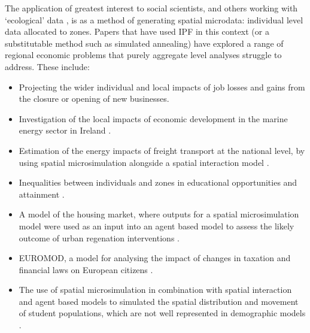 \documentclass[a4paper,10pt]{article}
\begin{document}
The application of greatest interest to social scientists, and others working
with `ecological' data \citep{Openshaw1984}, is as a method of
generating spatial microdata: individual level data allocated to zones.
Papers that have used IPF in this context (or a substitutable method such as simulated annealing)
have explored a range of regional economic problems that purely aggregate level analyses struggle to address.
These include:
\begin{itemize}
 \item Projecting the wider individual and local impacts
of job losses and gains from the closure \citep{Ballas2006}
or opening \citep{VanLeeuwen2010} of new businesses.
\item Investigation of the local impacts of economic development
in the marine energy sector in Ireland \citep{Morrissey2013a}.
\item Estimation of the energy impacts of freight transport at the
national level, by using spatial microsimulation alongside
a spatial interaction model \citep{Zuo2013a}.
\item Inequalities between individuals and zones in educational opportunities
and attainment \citep{Kavroudakis2012}.
\item A model of the housing market, where outputs
for a spatial microsimulation model were used as an input into
an agent based model to assess the likely outcome of urban regenation
interventions \citep{jordan2011agent}.
\item EUROMOD, a model for analysing the impact of changes
in taxation and financial laws on European citizens \citep{sutherland2013euromod}.
\item The use of spatial microsimulation in combination with
spatial interaction and agent based models to simulated the spatial
distribution and movement of student populations, which
are not well represented in demographic models \citep{Wu2010}.
\end{itemize}

% 
\end{document}
